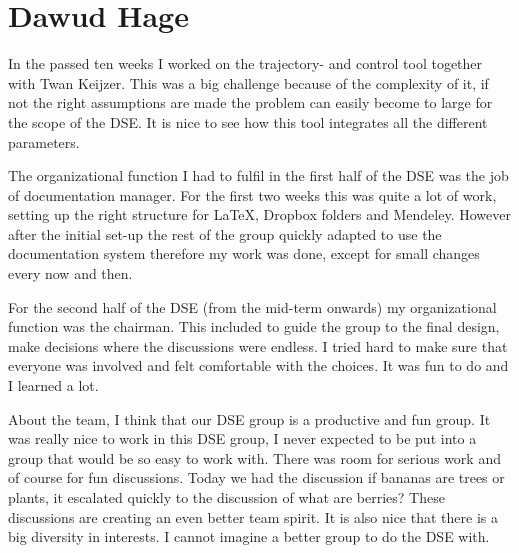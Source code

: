 \section{Dawud Hage}


In the passed ten weeks I worked on the trajectory- and control tool together with Twan Keijzer. This was a big challenge because of the complexity of it, if not the right assumptions are made the problem can easily become to large for the scope of the DSE. It is nice to see how this tool integrates all the different parameters.

The organizational function I had to fulfil in the first half of the DSE was the job of documentation manager. For the first two weeks this was quite a lot of work, setting up the right structure for LaTeX, Dropbox folders and Mendeley. However after the initial set-up the rest of the group quickly adapted to use the documentation system therefore my work was done, except for small changes every now and then.

For the second half of the DSE (from the mid-term onwards) my organizational function was the chairman. This included to guide the group to the final design, make decisions where the discussions were endless. I tried hard to make sure that everyone was involved and felt comfortable with the choices. It was fun to do and I learned a lot.  

About the team, I think that our DSE group is a productive and fun group. It was really nice to work in this DSE group, I never expected to be put into a group that would be so easy to work with. There was room for serious work and of course for fun discussions. Today we had the discussion if bananas are trees or plants, it escalated quickly to the discussion of what are berries? These discussions are creating an even better team spirit. It is also nice that there is a big diversity in interests. I cannot imagine a better group to do the DSE with.